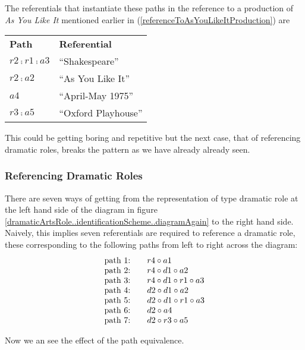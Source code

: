 The referentials that instantiate these paths in 
the reference to a production of 
\textit{As You Like It} mentioned earlier in (\ref{referenceToAsYouLikeItProduction}) 
are\\
\newline
\begin{center}
\begin{tabular}{l l}
\textbf{Path}          & \textbf{Referential} \\
$r2 \comp r1 \comp a3$ & ``Shakespeare''       \\
$r2\comp a2$           & ``As You Like It''   \\
$a4$                   & ``April-May 1975''   \\
$r3 \comp a5$          & ``Oxford Playhouse''
\end{tabular}
\end{center}

This could be getting boring and repetitive but the next case, that of referencing dramatic roles, breaks the pattern as  we have already already seen.

\subsubsection{Referencing Dramatic Roles}

There are seven ways of getting from the representation of type dramatic role at the left hand side of the diagram in figure \ref{dramaticArtsRole..identificationScheme..diagramAgain} to the right hand side. Naively, this implies seven referentials are required to reference a dramatic role, these corresponding to the following paths from left to right across the diagram:
\begin{displaymath}
\begin{array}{l c l}
\text{path 1:} &  & r4 \circ a1 \\
\text{path 2:} & & r4 \circ d1 \circ a2 \\
\text{path 3:} & & r4 \circ d1 \circ r1 \circ a3 \\
\text{path 4:} &  & d2 \circ d1 \circ a2 \\
\text{path 5:} &  & d2 \circ d1 \circ r1 \circ a3 \\
\text{path 6:} &  & d2 \circ a4 \\
\text{path 7:} &  & d2 \circ r3 \circ a5
\end{array}
\end{displaymath}

Now we an see the effect of the path equivalence.

